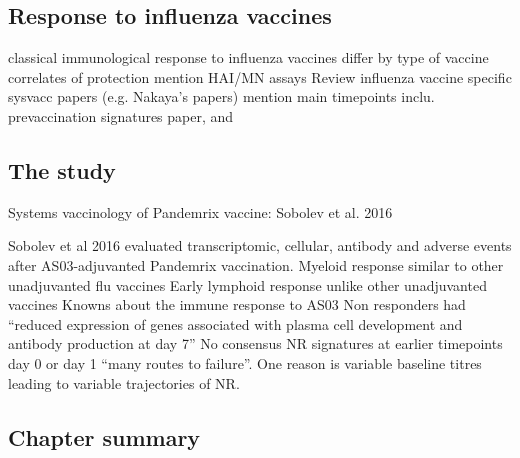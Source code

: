 \subsection{Response to influenza vaccines}

\begin{outline}
    \1 classical immunological response to influenza vaccines
        \2 differ by type of vaccine
    \1 correlates of protection
        \2 mention HAI/MN assays
    \1 Review influenza vaccine specific sysvacc papers (e.g. Nakaya's papers)
        \2 mention main timepoints
        \2 inclu. prevaccination signatures paper, and
\end{outline}

\subsection{The  study}

\begin{outline}

\1 Systems vaccinology of Pandemrix vaccine: Sobolev et al. 2016

    \2 Sobolev et al 2016 evaluated transcriptomic, cellular, antibody and adverse events after AS03-adjuvanted Pandemrix vaccination.
        \3 Myeloid response similar to other unadjuvanted flu vaccines
        \3 Early lymphoid response unlike other unadjuvanted vaccines
            \4 Knowns about the immune response to AS03
        \3 Non responders had \enquote{reduced expression of genes associated with plasma cell development and antibody production at day 7}
        \3 No consensus NR signatures at earlier timepoints day 0 or day 1 \enquote{many routes to failure}. One reason is variable baseline titres leading to variable trajectories of NR.

\end{outline}

\subsection{Chapter summary}

